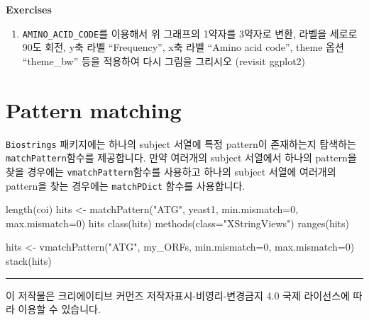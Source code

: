\documentclass[
  a4paper,
]{book}
\newenvironment{Shaded}{\begin{snugshade}}{\end{snugshade}}
\newcommand{\AttributeTok}[1]{\textcolor[rgb]{0.40,0.45,0.13}{#1}}
\newcommand{\DecValTok}[1]{\textcolor[rgb]{0.68,0.00,0.00}{#1}}
\newcommand{\FunctionTok}[1]{\textcolor[rgb]{0.28,0.35,0.67}{#1}}
\newcommand{\NormalTok}[1]{\textcolor[rgb]{0.00,0.23,0.31}{#1}}
\newcommand{\OtherTok}[1]{\textcolor[rgb]{0.00,0.23,0.31}{#1}}
\newcommand{\StringTok}[1]{\textcolor[rgb]{0.13,0.47,0.30}{#1}}
\providecommand{\tightlist}{%
  \setlength{\itemsep}{0pt}\setlength{\parskip}{0pt}}\usepackage{longtable,booktabs,array}
\begin{document}
\textbf{Exercises}

\begin{enumerate}
\def\labelenumi{\arabic{enumi})}
\tightlist
\item
  \texttt{AMINO\_ACID\_CODE}를 이용해서 위 그래프의 1약자를 3약자로
  변환, 라벨을 세로로 90도 회전, y축 라벨 ``Frequency'', x축 라벨
  ``Amino acid code'', theme 옵션 ``theme\_bw'' 등을 적용하여 다시
  그림을 그리시오 (revisit ggplot2)
\end{enumerate}

\hypertarget{pattern-matching}{%
\section{Pattern matching}\label{pattern-matching}}

\texttt{Biostrings} 패키지에는 하나의 subject 서열에 특정 pattern이
존재하는지 탐색하는 \texttt{matchPattern}함수를 제공합니다. 만약
여러개의 subject 서열에서 하나의 pattern을 찾을 경우에는
\texttt{vmatchPattern}함수를 사용하고 하나의 subject 서열에 여러개의
pattern을 찾는 경우에는 \texttt{matchPDict} 함수를 사용합니다.

\begin{Shaded}
\begin{Highlighting}[]
\FunctionTok{length}\NormalTok{(coi)}
\NormalTok{hits }\OtherTok{\textless{}{-}} \FunctionTok{matchPattern}\NormalTok{(}\StringTok{"ATG"}\NormalTok{, yeast1, }\AttributeTok{min.mismatch=}\DecValTok{0}\NormalTok{, }\AttributeTok{max.mismatch=}\DecValTok{0}\NormalTok{)}
\NormalTok{hits}
\FunctionTok{class}\NormalTok{(hits)}
\FunctionTok{methods}\NormalTok{(}\AttributeTok{class=}\StringTok{"XStringViews"}\NormalTok{)}
\FunctionTok{ranges}\NormalTok{(hits)}

\NormalTok{hits }\OtherTok{\textless{}{-}} \FunctionTok{vmatchPattern}\NormalTok{(}\StringTok{"ATG"}\NormalTok{, my\_ORFs, }\AttributeTok{min.mismatch=}\DecValTok{0}\NormalTok{, }\AttributeTok{max.mismatch=}\DecValTok{0}\NormalTok{)}
\FunctionTok{stack}\NormalTok{(hits)}
\end{Highlighting}
\end{Shaded}

\begin{center}\rule{0.5\linewidth}{0.5pt}\end{center}

이 저작물은 크리에이티브 커먼즈 저작자표시-비영리-변경금지 4.0 국제
라이선스에 따라 이용할 수 있습니다.


\backmatter
\end{document}

